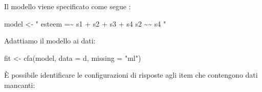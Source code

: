 \documentclass[
  11pt,
]{krantz}
\makeatletter
\newenvironment{Shaded}{\begin{snugshade}}{\end{snugshade}}
\newcommand{\AttributeTok}[1]{\textcolor[rgb]{0.61,0.61,0.61}{#1}}
\newcommand{\CommentTok}[1]{\textcolor[rgb]{0.37,0.37,0.37}{\textit{#1}}}
\newcommand{\DecValTok}[1]{\textcolor[rgb]{0.06,0.06,0.06}{#1}}
\newcommand{\FunctionTok}[1]{\textcolor[rgb]{0,0,0}{#1}}
\newcommand{\NormalTok}[1]{#1}
\newcommand{\OtherTok}[1]{\textcolor[rgb]{0.37,0.37,0.37}{#1}}
\newcommand{\SpecialCharTok}[1]{\textcolor[rgb]{0,0,0}{#1}}
\newcommand{\StringTok}[1]{\textcolor[rgb]{0.5,0.5,0.5}{#1}}
\newenvironment{kframe}{%
\medskip{}
\setlength{\fboxsep}{.8em}
 \def\at@end@of@kframe{}%
 \ifinner\ifhmode%
  \def\at@end@of@kframe{\end{minipage}}%
  \begin{minipage}{\columnwidth}%
 \fi\fi%
 \def\FrameCommand##1{\hskip\@totalleftmargin \hskip-\fboxsep
 \colorbox{shadecolor}{##1}\hskip-\fboxsep
     \hskip-\linewidth \hskip-\@totalleftmargin \hskip\columnwidth}%
 \MakeFramed {\advance\hsize-\width
   \@totalleftmargin\z@ \linewidth\hsize
   \@setminipage}}%
 {\par\unskip\endMakeFramed%
 \at@end@of@kframe}
\renewenvironment{Shaded}{\begin{kframe}}{\end{kframe}}
\theoremstyle{definition}
\theoremstyle{definition}
\theoremstyle{definition}
\theoremstyle{definition}
\theoremstyle{remark}
\makeatother
\begin{document}
Il modello viene specificato come segue \citep[seguiamo][]{brown2015confirmatory}:

\begin{Shaded}
\begin{Highlighting}[]
\NormalTok{model }\OtherTok{\textless{}{-}} \StringTok{"}
\StringTok{  esteem =\textasciitilde{} s1 + s2 + s3 + s4}
\StringTok{  s2 \textasciitilde{}\textasciitilde{} s4}
\StringTok{"}
\end{Highlighting}
\end{Shaded}

Adattiamo il modello ai dati:

\begin{Shaded}
\begin{Highlighting}[]
\NormalTok{fit }\OtherTok{\textless{}{-}} \FunctionTok{cfa}\NormalTok{(model, }\AttributeTok{data =}\NormalTok{ d, }\AttributeTok{missing =} \StringTok{"ml"}\NormalTok{)}
\end{Highlighting}
\end{Shaded}

È possibile identificare le configurazioni di risposte agli item che contengono dati mancanti:

\begin{Shaded}
\end{Shaded}

\begin{Shaded}
\end{Shaded}
\end{document}
